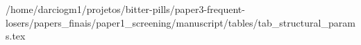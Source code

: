 /home/darciogm1/projetos/bitter-pills/paper3-frequent-losers/papers_finais/paper1_screening/manuscript/tables/tab_structural_params.tex